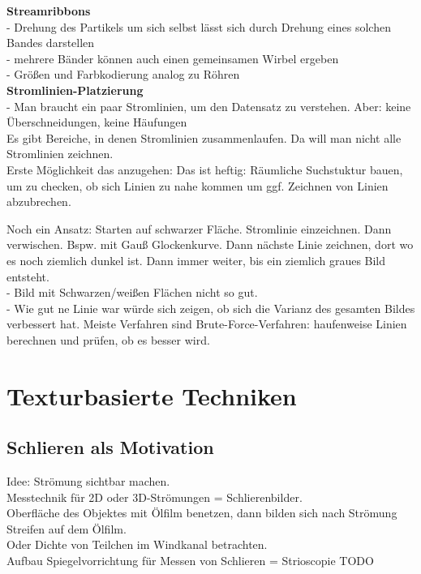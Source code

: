 \documentclass{article}
\begin{document}
\noindent \textbf{Streamribbons}\\
- Drehung des Partikels um sich selbst lässt sich durch Drehung eines solchen Bandes darstellen\\
- mehrere Bänder können auch einen gemeinsamen Wirbel ergeben\\
- Größen und Farbkodierung analog zu Röhren\\

\noindent \textbf{Stromlinien-Platzierung}\\
- Man braucht ein paar Stromlinien, um den Datensatz zu verstehen. Aber: keine Überschneidungen, keine Häufungen\\
Es gibt Bereiche, in denen Stromlinien zusammenlaufen. Da will man nicht alle Stromlinien zeichnen.\\
Erste Möglichkeit das anzugehen:
Das ist heftig:  Räumliche Suchstuktur bauen, um zu checken, ob sich Linien zu nahe kommen um ggf. Zeichnen von Linien abzubrechen.

\noindent Noch ein Ansatz:
Starten auf schwarzer Fläche. Stromlinie einzeichnen. Dann verwischen. Bspw. mit Gauß Glockenkurve. Dann nächste Linie zeichnen, dort wo es noch ziemlich dunkel ist. Dann immer weiter, bis ein ziemlich graues Bild entsteht.\\
- Bild mit Schwarzen/weißen Flächen nicht so gut.\\
- Wie gut ne Linie war würde sich zeigen, ob sich die Varianz  des gesamten Bildes verbessert hat.
Meiste Verfahren sind Brute-Force-Verfahren: haufenweise Linien berechnen und prüfen, ob es besser wird.

\pagebreak
\section{Texturbasierte Techniken}
\subsection{Schlieren als Motivation}
Idee: Strömung sichtbar machen.\\
Messtechnik für 2D oder 3D-Strömungen = Schlierenbilder.\\

\noindent Oberfläche des Objektes mit Ölfilm benetzen, dann bilden sich nach Strömung Streifen auf dem Ölfilm.\\
Oder Dichte von Teilchen im Windkanal betrachten.\\

\noindent Aufbau Spiegelvorrichtung für Messen von Schlieren = Strioscopie TODO
\end{document}
